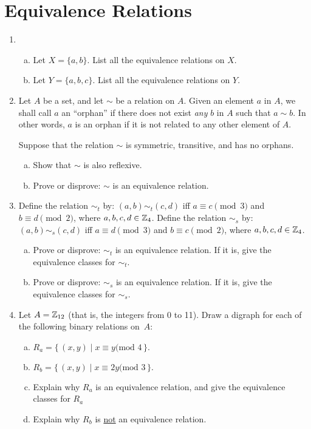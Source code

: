\begin{enumerate}
\end{enumerate}

\section{Equivalence Relations}

\begin{enumerate}

\item
\begin{enumerate}[(a)]
\item
Let $X =\{a, b\}$. List all the equivalence relations on $X$.
\item
Let $Y =\{a, b,c\}$. List all the equivalence relations on $Y$.
\end{enumerate}

\item
Let $A$ be a set, and let $\sim$ be a relation on $A$. Given an element $a$ in  $A$, we shall call $a$ an ``orphan'' if there does not exist \emph{any} $b$ in $A$ such that $a \sim b$. In other words, $a$ is an orphan if it is not related to any other element of $A$.  

Suppose that the relation $\sim$ is symmetric, transitive, and has no orphans.  
\begin{enumerate}[(a)]
\item
Show that $\sim$ is also reflexive.
\item
Prove or disprove:  $\sim$ is an equivalence relation.
\end{enumerate}

\item
Define the relation $\sim_t$ by:  $(a,b) \sim_t  (c,d)$  iff $a \equiv c \pmod{3}$ and $b \equiv d \pmod{2}$, where $a,b,c,d  \in \mathbb{Z}_4$.  Define the relation $\sim_s$  by:  $(a,b) \sim_s (c,d)$ iff $a \equiv d \pmod{3}$ and 
$b \equiv c \pmod{2}$, where $a,b,c,d \in \mathbb{Z}_4$.
\begin{enumerate}[(a)]
\item
Prove or disprove: $\sim_t$ is an equivalence relation. If it is, give the equivalence classes for $\sim_t$.
\item
Prove or disprove: $\sim_s$ is an equivalence relation. If it is, give the equivalence classes for $\sim_s$.
\end{enumerate}

\item
Let $A =  \mathbb{Z}_{12}$  (that is, the integers from 0 to 11). Draw a digraph for each of the following binary relations on~$A$: 
 \begin{enumerate}[(a)]
 \item \label{DrawBinRelExer-married}
 $ R_a = \{\, (x,y) \mid  x \equiv y \text{(mod }4 \,\} .$
  \item \label{DrawBinRelExer-lived}
 $ R_b = \{\, (x,y) \mid  x \equiv 2y \text{(mod }3 \,\} .$
 \item
Explain why $R_a$ is an equivalence relation, and give the equivalence classes for $R_a$
\item
Explain why $R_b$ is \underline{not} an equivalence relation.
\end{enumerate}


\end{enumerate}
